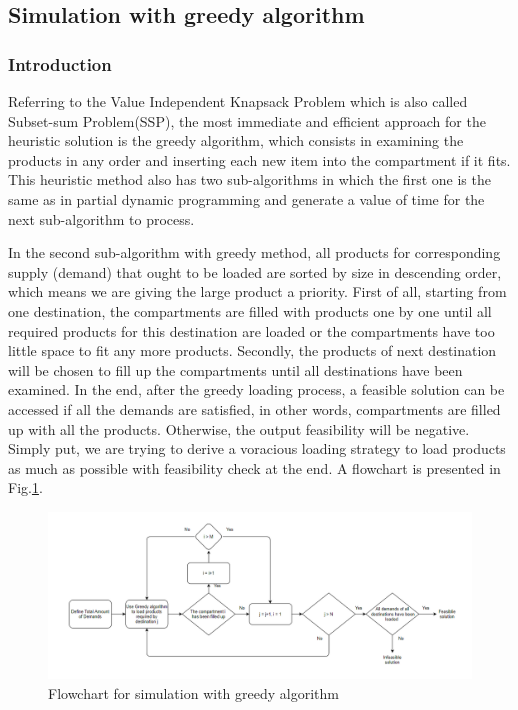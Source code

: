 \documentclass{article}
\begin{document}
\subsection{Simulation with greedy algorithm}

\subsubsection{Introduction}
Referring to the Value Independent Knapsack Problem which is also called Subset-sum Problem(SSP), the most immediate and efficient approach for the heuristic solution is the greedy algorithm, which consists in examining the products in any order and inserting each new item into the compartment if it fits. This heuristic method also has two sub-algorithms in which the first one is the same as in partial dynamic programming and generate a value of time for the next sub-algorithm to process.

In the second sub-algorithm with greedy method, all products for corresponding supply (demand) that ought to be loaded are sorted by size in descending order, which means we are giving the large product a priority. First of all, starting from one destination, the compartments are filled with products one by one until all required products for this destination are loaded or the compartments have too little space to fit any more products. Secondly, the products of next destination will be chosen to fill up the compartments until all destinations have been examined. In the end, after the greedy loading process, a feasible solution can be accessed if all the demands are satisfied, in other words, compartments are filled up with all the products. Otherwise, the output feasibility will be negative. Simply put, we are trying to derive a voracious loading strategy to load products as much as possible with feasibility check at the end. A flowchart is presented in Fig.\ref{fig:flowchartgreedy}.

\begin{figure}[ht]
    \centering
    \includegraphics[scale=0.6]{flowchartgreedy.png}
    \caption{Flowchart for simulation with greedy algorithm}
    \label{fig:flowchartgreedy}
\end{figure}
\end{document}
